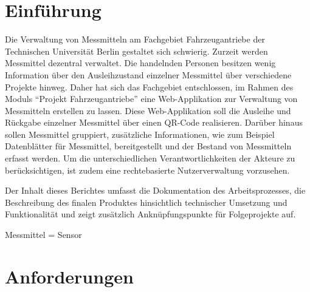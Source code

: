 \documentclass[
]{article}
\author{}
\date{\vspace{-2.5em}}
\begin{document}
\renewcommand*\contentsname{Inhaltsverzeichnis}
{
\setcounter{tocdepth}{2}
\tableofcontents
}
\renewcommand{\figurename}{Abbildung}
\renewcommand{\tablename}{Tabelle}
\renewcommand{\listfigurename}{Abbildungsverzeichnis}
\renewcommand{\listtablename}{Tabellenverzeichnis}
\renewcommand{\refname}{Literaturverzeichnis}


\newpage{}

\listoffigures
{}

\newpage{}

\listoftables
{}

\newpage{}


\hypertarget{introduction}{%
\section{Einführung}\label{introduction}}

Die Verwaltung von Messmitteln am Fachgebiet Fahrzeugantriebe der Technischen Universität Berlin gestaltet sich schwierig. Zurzeit werden Messmittel dezentral verwaltet. Die handelnden Personen besitzen wenig Information über den Ausleihzustand einzelner Messmittel über verschiedene Projekte hinweg. Daher hat sich das Fachgebiet entschlossen, im Rahmen des Moduls ``Projekt Fahrzeugantriebe'' eine Web-Applikation zur Verwaltung von Messmitteln erstellen zu lassen. Diese Web-Applikation soll die Ausleihe und Rückgabe einzelner Messmittel über einen QR-Code realisieren. Darüber hinaus sollen Messmittel gruppiert, zusätzliche Informationen, wie zum Beispiel Datenblätter für Messmittel, bereitgestellt und der Bestand von Messmitteln erfasst werden. Um die unterschiedlichen Verantwortlichkeiten der Akteure zu berücksichtigen, ist zudem eine rechtebasierte Nutzerverwaltung vorzusehen.

Der Inhalt dieses Berichtes umfasst die Dokumentation des Arbeitsprozesses, die Beschreibung des finalen Produktes hinsichtlich technischer Umsetzung und Funktionalität und zeigt zusätzlich Anknüpfungspunkte für Folgeprojekte auf.

Messmittel = Sensor

\hypertarget{requirements}{%
\section{Anforderungen}\label{requirements}}
\end{document}
